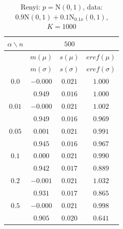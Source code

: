 \documentclass[11pt,a4paper]{beamer}
\begin{document}
\begin{frame}
	\begin{table}[ht] \footnotesize 
\begin{center} 
\begin{tabular}{|c|ccc|} 
\hline 
$\alpha\backslash n$ &&  $500$ & \\ 
\hline 
& $m(\mu)$ & $s(\mu)$ & $eref(\mu)$ \\ 
& $m(\sigma)$ & $s(\sigma)$ & $eref(\sigma)$\\ 
\hline 
$0.0$ & $ -0.000 $ & $ 0.021 $ & $ 1.000 $\\ 
 & $ 0.949 $ & $ 0.016 $ & $ 1.000 $\\ 
\hline 
$0.01$ &  $ -0.000 $ & $ 0.021 $ & $ 1.002 $\\ 
 &  $ 0.949 $ & $ 0.016 $ & $ 0.969 $\\ 
\hline 
$0.05$ & $ 0.001 $ & $ 0.021 $ & $ 0.991 $\\ 
 &  $ 0.945 $ & $ 0.016 $ & $ 0.967 $\\ 
\hline 
$0.1$ & $ 0.000 $ & $ 0.021 $ & $ 0.990 $\\ 
 & $ 0.942 $ & $ 0.017 $ & $ 0.889 $\\ 
\hline 
$0.2$ &  $ -0.001 $ & $ 0.021 $ & $ 1.032 $\\ 
 & $ 0.931 $ & $ 0.017 $ & $ 0.865 $\\ 
\hline 
$0.5$ &  $ -0.000 $ & $ 0.021 $ & $ 0.998 $\\ 
 & $ 0.905 $ & $ 0.020 $ & $ 0.641 $\\ 
\hline 
\end{tabular}
\caption{Renyi: $p = \mathrm{N}(0,1)$, data: $0.9\mathrm{N}(0,1) + 0.1\mathrm{N}_{0.1x}(0,1)$, $K = 1000$} 
\end{center}
\end{table}
\end{frame}
\end{document}

